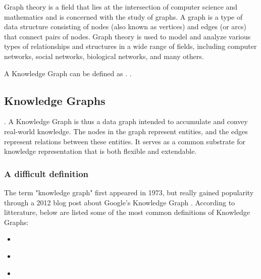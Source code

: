 \documentclass[11pt]{article} %
\begin{document}
Graph theory is a field that lies at the intersection of computer science and mathematics and is concerned with the study of graphs. A graph is a type of data structure consisting of nodes (also known as vertices) and edges (or arcs) that connect pairs of nodes. Graph theory is used to model and analyze various types of relationships and structures in a wide range of fields, including computer networks, social networks, biological networks, and many others.

A Knowledge Graph can be defined as  \cite[p.3]{KG21}.  \cite[p.31]{KG21}.

\subsection{Knowledge Graphs}
 \cite[p.4]{KG21}. A Knowledge Graph is thus a data graph intended to accumulate and convey real-world knowledge. The nodes in the graph represent entities, and the edges represent relations between these entities. It serves as a common substrate for knowledge representation that is both flexible and extendable.

\subsubsection*{A difficult definition}
The term "knowledge graph" first appeared in 1973, but really gained popularity through a 2012 blog post about Google's Knowledge Graph \cite*{googleblog2023knowledgegraph}. According to litterature, below are listed some of the most common definitions of Knowledge Graphs:
\begin{itemize}
    \item {} \cite{TDKG16}
    \item {} \cite{KG21}
    \item {} \cite{CKG23}
\end{itemize}
\end{document}
